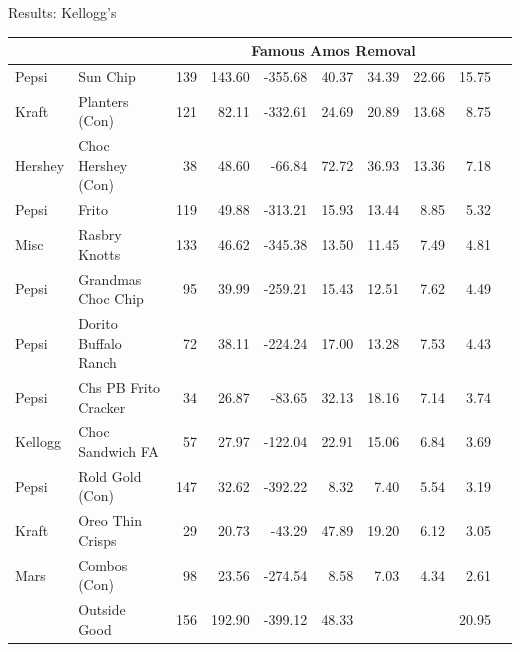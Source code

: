 \documentclass[aspectratio=169]{beamer}
\begin{document}
\begin{frame}{Results: Kellogg's}
\begin{tabular}{ll |   r r r r  r r r  r}
\hline  &&\multicolumn{7}{c}{Famous Amos Removal}\\ \hline
Pepsi & Sun Chip & 139 & 143.60 & -355.68 & 40.37 & 34.39 & 22.66 & 15.75 \\
Kraft & Planters (Con) & 121 & 82.11 & -332.61 & 24.69 & 20.89 & 13.68 & 8.75 \\
Hershey & Choc Hershey (Con) & 38 & 48.60 & -66.84 & 72.72 & 36.93 & 13.36 & 7.18 \\
Pepsi & Frito & 119 & 49.88 & -313.21 & 15.93 & 13.44 & 8.85 & 5.32 \\
Misc & Rasbry Knotts & 133 & 46.62 & -345.38 & 13.50 & 11.45 & 7.49 & 4.81 \\
Pepsi & Grandmas Choc Chip & 95 & 39.99 & -259.21 & 15.43 & 12.51 & 7.62 & 4.49 \\
Pepsi & Dorito Buffalo Ranch & 72 & 38.11 & -224.24 & 17.00 & 13.28 & 7.53 & 4.43 \\
Pepsi & Chs PB Frito Cracker & 34 & 26.87 & -83.65 & 32.13 & 18.16 & 7.14 & 3.74 \\
Kellogg & Choc Sandwich FA & 57 & 27.97 & -122.04 & 22.91 & 15.06 & 6.84 & 3.69 \\
Pepsi & Rold Gold (Con) & 147 & 32.62 & -392.22 & 8.32 & 7.40 & 5.54 & 3.19 \\
Kraft & Oreo Thin Crisps & 29 & 20.73 & -43.29 & 47.89 & 19.20 & 6.12 & 3.05 \\
Mars & Combos (Con) & 98 & 23.56 & -274.54 & 8.58 & 7.03 & 4.34 & 2.61 \\
& Outside Good& 156 & 192.90 & -399.12 & 48.33 &  &  & 20.95 \\
\end{tabular}
\end{frame}
\end{document}
